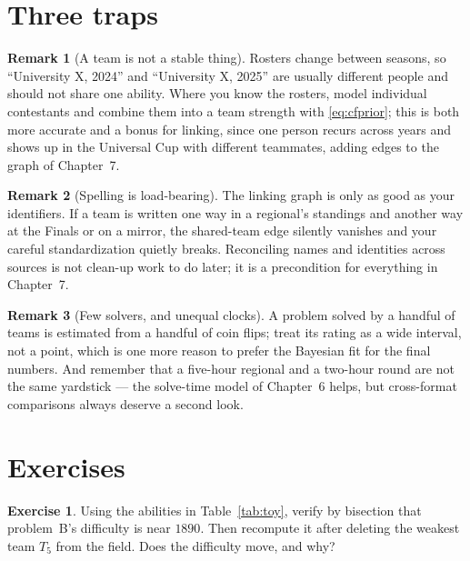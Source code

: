 \documentclass[11pt]{report}
\theoremstyle{definition}
\newtheorem{remark}{Remark}[chapter]
\newtheorem{exercise}{Exercise}[chapter]
\numberwithin{equation}{chapter}
\begin{document}
\section{Three traps}

\begin{remark}[A team is not a stable thing]
Rosters change between seasons, so ``University X, 2024'' and ``University X,
2025'' are usually different people and should not share one ability. Where you
know the rosters, model individual contestants and combine them into a team
strength with \eqref{eq:cfprior}; this is both more accurate and a bonus for
linking, since one person recurs across years and shows up in the Universal Cup
with different teammates, adding edges to the graph of Chapter~7.
\end{remark}

\begin{remark}[Spelling is load-bearing]
The linking graph is only as good as your identifiers. If a team is written one
way in a regional's standings and another way at the Finals or on a mirror, the
shared-team edge silently vanishes and your careful standardization quietly
breaks. Reconciling names and identities across sources is not clean-up work to do
later; it is a precondition for everything in Chapter~7.
\end{remark}

\begin{remark}[Few solvers, and unequal clocks]
A problem solved by a handful of teams is estimated from a handful of coin flips;
treat its rating as a wide interval, not a point, which is one more reason to
prefer the Bayesian fit for the final numbers. And remember that a five-hour
regional and a two-hour round are not the same yardstick --- the solve-time model
of Chapter~6 helps, but cross-format comparisons always deserve a second look.
\end{remark}

\section*{Exercises}

\begin{exercise}
Using the abilities in Table~\ref{tab:toy}, verify by bisection that problem~B's
difficulty is near $1890$. Then recompute it after deleting the weakest team
$T_5$ from the field. Does the difficulty move, and why?
\end{exercise}
\end{document}

